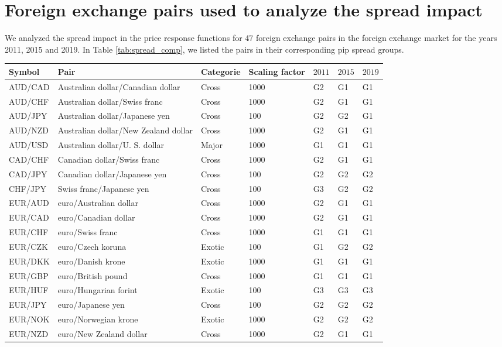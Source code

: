 \section{Foreign exchange pairs used to analyze the spread impact}
\label{app:fx_pairs_spread}

We analyzed the spread impact in the price response functions for 47 foreign
exchange pairs in the foreign exchange market for the years 2011, 2015 and
2019. In Table \ref{tab:spread_comp}, we listed the pairs in their corresponding pip spread groups.

\begin{table*}
\begin{center}
\begin{centering}
    \begin{threeparttable}
    \caption{Foreign exchange pairs used in Sect. \ref{sec:spread_impact}.}
    \label{tab:spread_comp}
    \begin{tabular}{lllllll}
    \hline
    Symbol & Pair & Categorie & Scaling factor & $2011$ & $2015$ & $2019$\tabularnewline
    \hline
    AUD/CAD & Australian dollar/Canadian dollar & Cross & 1000 & G2 & G1 & G1\tabularnewline
    AUD/CHF & Australian dollar/Swiss franc & Cross & 1000 & G2 & G1 & G1\tabularnewline
    AUD/JPY & Australian dollar/Japanese yen & Cross & 100 & G2 & G2 & G1\tabularnewline
    AUD/NZD & Australian dollar/New Zealand dollar & Cross & 1000 & G2 & G1 & G1\tabularnewline
    AUD/USD & Australian dollar/U. S. dollar & Major & 1000 & G1 & G1 & G1\tabularnewline
    CAD/CHF & Canadian dollar/Swiss franc & Cross & 1000 & G2 & G1 & G1\tabularnewline
    CAD/JPY & Canadian dollar/Japanese yen & Cross & 100 & G2 & G2 & G2\tabularnewline
    CHF/JPY & Swiss franc/Japanese yen & Cross & 100 & G3 & G2 & G2\tabularnewline
    EUR/AUD & euro/Australian dollar & Cross & 1000 & G2 & G1 & G1\tabularnewline
    EUR/CAD & euro/Canadian dollar & Cross & 1000 & G2 & G1 & G1\tabularnewline
    EUR/CHF & euro/Swiss franc & Cross & 1000 & G1 & G1 & G1\tabularnewline
    EUR/CZK & euro/Czech koruna & Exotic & 100 & G1 & G2 & G2\tabularnewline
    EUR/DKK & euro/Danish krone & Exotic & 1000 & G1 & G1 & G1\tabularnewline
    EUR/GBP & euro/British pound & Cross & 1000 & G1 & G1 & G1\tabularnewline
    EUR/HUF & euro/Hungarian forint & Exotic & 100 & G3 & G3 & G3\tabularnewline
    EUR/JPY & euro/Japanese yen & Cross & 100 & G2 & G2 & G2\tabularnewline
    EUR/NOK & euro/Norwegian krone & Exotic & 1000 & G2 & G2 & G2\tabularnewline
    EUR/NZD & euro/New Zealand dollar & Cross & 1000 & G2 & G1 & G1\tabularnewline

\end{tabular}
\end{threeparttable}
\end{centering}
\end{center}
\end{table*}
